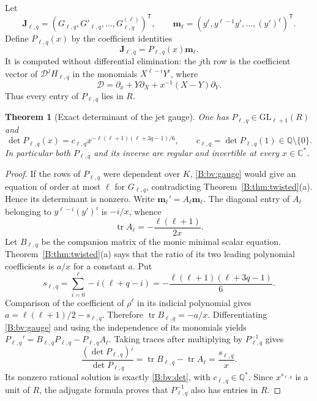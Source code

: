 \documentclass[11pt,a4paper]{article}
\newtheorem{theorem}{Theorem}[section]
\theoremstyle{definition}
\theoremstyle{remark}
\numberwithin{equation}{section}
\begin{document}
Let
\[
 \mathbf J_{\ell,q}=(G_{\ell,q},G'_{\ell,q},\ldots,
                        G_{\ell,q}^{(\ell)})^{\mathsf T},
 \qquad
 \mathbf m_{\ell}=(y^{\ell},y^{\ell-1}y',\ldots,(y')^{\ell})^{\mathsf T}.
\]
Define $P_{\ell,q}(x)$ by the coefficient identities
\begin{equation}\label{B:bv:gauge}
 \mathbf J_{\ell,q}=P_{\ell,q}(x)\mathbf m_{\ell}.
\end{equation}
It is computed without differential elimination: the $j$th row is
the coefficient vector of $\mathscr D^jH_{\ell,q}$ in the monomials
$X^{\ell-i}Y^i$, where
\[
 \mathscr D=\partial_x+Y\partial_X+x^{-1}(X-Y)\partial_Y.
\]
Thus every entry of $P_{\ell,q}$ lies in $R$.

\begin{theorem}[Exact determinant of the jet gauge]\label{B:bv:gaugedet}
One has $P_{\ell,q}\in\mathrm{GL}_{\ell+1}(R)$ and
\begin{equation}\label{B:bv:det}
 \det P_{\ell,q}(x)=c_{\ell,q}
 x^{-\ell(\ell+1)(\ell+3q-1)/6},
 \qquad c_{\ell,q}=\det P_{\ell,q}(1)\in\mathbb Q\setminus\{0\}.
\end{equation}
In particular both $P_{\ell,q}$ and its inverse are regular and
invertible at every $x\in\mathbb C^*$.
\end{theorem}

\begin{proof}
If the rows of $P_{\ell,q}$ were dependent over $K$,
\eqref{B:bv:gauge} would give an equation of order at most $\ell$
for $G_{\ell,q}$, contradicting Theorem~\ref{B:thm:twisted}(a).
Hence its determinant is nonzero.
Write $\mathbf m_\ell'=A_\ell\mathbf m_\ell$. The diagonal entry
of $A_\ell$ belonging to $y^{\ell-i}(y')^i$ is $-i/x$, whence
\[
 \operatorname{tr}A_\ell=-\frac{\ell(\ell+1)}{2x}.
\]
Let $B_{\ell,q}$ be the companion matrix of the monic minimal
scalar equation. Theorem~\ref{B:thm:twisted}(a) says that the ratio
of its two leading polynomial coefficients is $a/x$ for a
constant $a$. Put
\[
 s_{\ell,q}=\sum_{i=0}^{\ell}-i(\ell+q-i)
       =-\frac{\ell(\ell+1)(\ell+3q-1)}6.
\]
Comparison of the coefficient of $\rho^\ell$ in its indicial
polynomial gives $a=\ell(\ell+1)/2-s_{\ell,q}$. Therefore
$\operatorname{tr}B_{\ell,q}=-a/x$.
Differentiating \eqref{B:bv:gauge} and using the independence of
its monomials yields
$P_{\ell,q}'=B_{\ell,q}P_{\ell,q}-P_{\ell,q}A_\ell$.
Taking traces after multiplying by $P_{\ell,q}^{-1}$ gives
\[
 \frac{(\det P_{\ell,q})'}{\det P_{\ell,q}}
   =\operatorname{tr}B_{\ell,q}-\operatorname{tr}A_\ell
   =\frac{s_{\ell,q}}x.
\]
Its nonzero rational solution is exactly \eqref{B:bv:det}, with
$c_{\ell,q}\in\mathbb Q^*$. Since $x^{s_{\ell,q}}$ is a unit
of $R$, the adjugate formula proves that $P_{\ell,q}^{-1}$
also has entries in $R$.
\end{proof}
\end{document}
